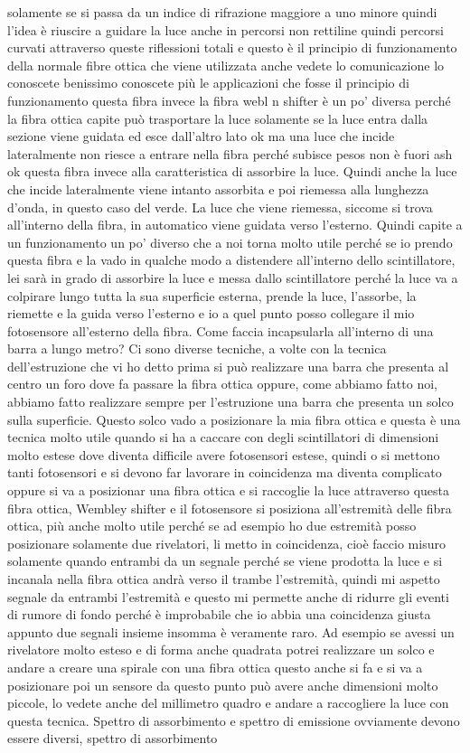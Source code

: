 solamente se si passa da un indice di rifrazione maggiore a uno minore quindi l'idea è riuscire a guidare la luce anche in percorsi non rettiline quindi percorsi curvati attraverso queste riflessioni totali e questo è il principio di funzionamento della normale fibre ottica che viene utilizzata anche vedete lo comunicazione lo conoscete benissimo conoscete più le applicazioni che fosse il principio di funzionamento questa fibra invece la fibra webl n shifter è un po' diversa perché la fibra ottica capite può trasportare la luce solamente se la luce entra dalla sezione viene guidata ed esce dall'altro lato ok ma una luce che incide lateralmente non riesce a entrare nella fibra perché subisce pesos non è fuori ash ok questa fibra invece alla caratteristica di assorbire la luce. Quindi anche la luce che incide lateralmente viene intanto assorbita e poi riemessa alla lunghezza d'onda, in questo caso del verde. La luce che viene riemessa, siccome si trova all'interno della fibra, in automatico viene guidata verso l'esterno. Quindi capite a un funzionamento un po' diverso che a noi torna molto utile perché se io prendo questa fibra e la vado in qualche modo a distendere all'interno dello scintillatore, lei sarà in grado di assorbire la luce e messa dallo scintillatore perché la luce va a colpirare lungo tutta la sua superficie esterna, prende la luce, l'assorbe, la riemette e la guida verso l'esterno e io a quel punto posso collegare il mio fotosensore all'esterno della fibra. Come faccia incapsularla all'interno di una barra a lungo metro? Ci sono diverse tecniche, a volte con la tecnica dell'estruzione che vi ho detto prima si può realizzare una barra che presenta al centro un foro dove fa passare la fibra ottica oppure, come abbiamo fatto noi, abbiamo fatto realizzare sempre per l'estruzione una barra che presenta un solco sulla superficie. Questo solco vado a posizionare la mia fibra ottica e questa è una tecnica molto utile quando si ha a caccare con degli scintillatori di dimensioni molto estese dove diventa difficile avere fotosensori estese, quindi o si mettono tanti fotosensori e si devono far lavorare in coincidenza ma diventa complicato oppure si va a posizionar una fibra ottica e si raccoglie la luce attraverso questa fibra ottica, Wembley shifter e il fotosensore si posiziona all'estremità delle fibra ottica, più anche molto utile perché se ad esempio ho due estremità posso posizionare solamente due rivelatori, li metto in coincidenza, cioè faccio misuro solamente quando entrambi da un segnale perché se viene prodotta la luce e si incanala nella fibra ottica andrà verso il trambe l'estremità, quindi mi aspetto segnale da entrambi l'estremità e questo mi permette anche di ridurre gli eventi di rumore di fondo perché è improbabile che io abbia una coincidenza giusta appunto due segnali insieme insomma è veramente raro. Ad esempio se avessi un rivelatore molto esteso e di forma anche quadrata potrei realizzare un solco e andare a creare una spirale con una fibra ottica questo anche si fa e si va a posizionare poi un sensore da questo punto può avere anche dimensioni molto piccole, lo vedete anche del millimetro quadro e andare a raccogliere la luce con questa tecnica. Spettro di assorbimento e spettro di emissione ovviamente devono essere diversi, spettro di assorbimento 
